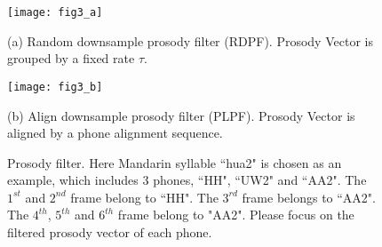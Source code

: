 \documentclass{article}
\begin{document}

\begin{figure*}[htb]
\begin{minipage}[b]{1.0\linewidth}
  \centering
  \centerline{\texttt{[image: fig3\_a]}}
  \centerline{(a) Random downsample prosody filter (RDPF). Prosody Vector is grouped by a fixed rate $\tau$. }\medskip
\end{minipage}
%
\begin{minipage}[b]{1.0\linewidth}
  \centering
  \centerline{\texttt{[image: fig3\_b]}}
  \centerline{(b) Align downsample prosody filter (PLPF). Prosody Vector is aligned by a phone alignment sequence.}\medskip
\end{minipage}

%
\caption{Prosody filter. Here Mandarin syllable ``hua2" is chosen as an example, which includes 3 phones, ``HH", ``UW2" and ``AA2". The $1^{st}$ and $2^{nd}$ frame belong to ``HH". The $3^{rd}$ frame belongs to ``AA2". The $4^{th}$, $5^{th}$ and $6^{th}$ frame belong to "AA2". Please focus on the filtered prosody vector of each phone.} 
\label{fig:res}
%
\end{figure*}




\end{document}
